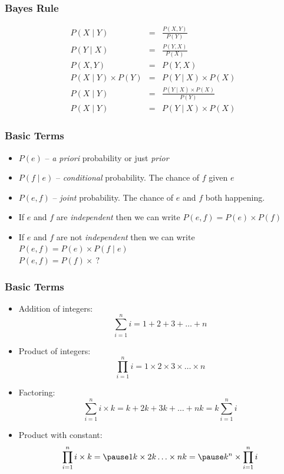 \documentclass[handout]{beamer}
\begin{document}
\begin{frame}
\frametitle{Bayes Rule}
\begin{center}
\begin{eqnarray}
P(X \mid Y) &= &\frac{P(X,Y)}{P(Y)} \\
P(Y \mid X) &= &\frac{P(Y,X)}{P(X)} \\
P(X,Y) &= &P(Y,X) \\
P(X \mid Y) \times P(Y) &= &P(Y \mid X) \times P(X) \\
P(X \mid Y) &= &\frac{P(Y \mid X) \times P(X)}{P(Y)} \\
P(X \mid Y) &= &P(Y \mid X) \times P(X)
\end{eqnarray}
\end{center}   

\end{frame}

\begin{frame}
\frametitle{Basic Terms}
\begin{itemize}[<+->]
\item $P(e)$ -- {\em a priori} probability or just {\em prior}
\item $P(f \mid e)$ -- {\em conditional} probability. The chance of
  $f$ given $e$
\item $P(e, f)$ -- {\em joint} probability. The chance of $e$ and $f$
  both happening.
\item If $e$ and $f$ are {\em independent} then we can write $P(e,f) =
  P(e) \times P(f)$
\item If $e$ and $f$ are not {\em independent} then we can write
  $P(e,f) = P(e) \times P(f \mid e)$ \\
 $P(e,f) = P(f) \times\ ?$
\end{itemize}

\end{frame}

\begin{frame}
\frametitle{Basic Terms}
\begin{itemize}[<+->]
\item Addition of integers: \[ \sum_{i=1}^n i = 1 + 2 + 3 + \ldots +
  n \]
\item Product of integers: \[ \prod_{i=1}^n i = 1 \times 2 \times 3
  \times \ldots \times n \]
\item Factoring: \[ \sum_{i=1}^n i \times k = k + 2k + 3k + \ldots + nk
  = k \sum_{i=1}^n i \]
\item Product with constant: \[ \prod_{i=1}^n i \times k = \pause 1 k \times 2 k \ldots \times n k = \pause k^n \times \prod_{i=1}^n i \]
\end{itemize}

\end{frame}
\end{document}
